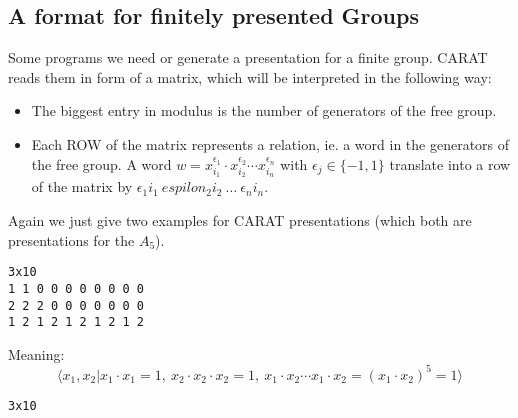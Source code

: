 \subsection{A format for finitely presented Groups}

Some programs we need or generate a presentation for a finite group.
CARAT reads them in form of a matrix, which will be interpreted in the
following way:
\begin{itemize}
\item The biggest entry in modulus is the number of generators of
      the free group.
\item Each ROW of the matrix represents a relation, ie. a word in
      the generators of the free group. A word
      $w=x_{i_1}^{\epsilon_1} \cdot x_{i_2}^{\epsilon_2} \cdots
         x_{i_n}^{\epsilon_n}$ with $\epsilon_j \in \{-1,1\}$ translate
      into a row of the matrix by $\epsilon_1 i_1\ espilon_2 i_2\ \dots\
      \epsilon_n i_n$.
\end{itemize}

Again we just give two examples for CARAT presentations (which both
are presentations for the $A_5$).

\bigskip
\begin{verbatim}
3x10
1 1 0 0 0 0 0 0 0 0
2 2 2 0 0 0 0 0 0 0
1 2 1 2 1 2 1 2 1 2
\end{verbatim}
Meaning:
\begin{displaymath}
\langle x_1,x_2 | x_1\cdot x_1=1,\ x_2 \cdot x_2\cdot x_2=1,\ 
                  x_1\cdot x_2 \cdots x_1 \cdot x_2 = (x_1 \cdot x_2)^5 = 1
\rangle
\end{displaymath}

\bigskip
\begin{verbatim}
3x10
\end{verbatim}
